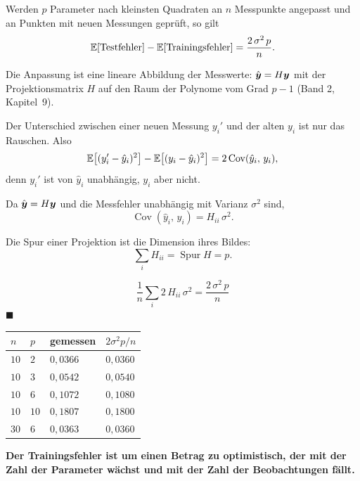 \begin{merksatz}
Werden $p$ Parameter nach kleinsten Quadraten an $n$ Messpunkte angepasst und an  Punkten mit neuen Messungen geprüft, so gilt
\[ \mathbb{E}[\text{Testfehler}] - \mathbb{E}[\text{Trainingsfehler}] = \frac{2\,\sigma^{2}\,p}{n} . \]

Die Anpassung ist eine lineare Abbildung der Messwerte: $\hat{\boldsymbol{y}} = H\boldsymbol{y}$ mit der Projektionsmatrix $H$ auf den Raum der Polynome vom Grad $p-1$ (Band 2, Kapitel~9).

 Der Unterschied zwischen einer neuen Messung $y_i'$ und der alten $y_i$ ist nur das Rauschen. Also
\[ \mathbb{E}\bigl[(y_i'-\hat y_i)^{2}\bigr] - \mathbb{E}\bigl[(y_i-\hat y_i)^{2}\bigr] = 2\operatorname{Cov}(\hat y_i,\,y_i) , \]
denn $y_i'$ ist von $\hat y_i$ unabhängig, $y_i$ aber nicht.

 Da $\hat{\boldsymbol{y}} = H\boldsymbol{y}$ und die Messfehler unabhängig mit Varianz $\sigma^{2}$ sind,
\[ \operatorname{Cov}(\hat y_i,\, y_i) = H_{ii}\,\sigma^{2} . \]

 Die Spur einer Projektion ist die Dimension ihres Bildes:
\[ \sum_i H_{ii} = \operatorname{Spur} H = p . \]

\[ \frac1n\sum_i 2\,H_{ii}\,\sigma^{2} = \frac{2\,\sigma^{2}\,p}{n} \]
$\blacksquare$

\begin{center}
{\small
\renewcommand{\arraystretch}{1.46}
\begin{tabular}{@{}P{1.2cm}P{1.2cm}P{2.4cm}P{2.4cm}@{}}
\toprule
$n$ & $p$ & \textbf{gemessen} & $2\sigma^{2}p/n$\\
\midrule
$10$ & $2$ & $0{,}0366$ & $0{,}0360$\\
$10$ & $3$ & $0{,}0542$ & $0{,}0540$\\
$10$ & $6$ & $0{,}1072$ & $0{,}1080$\\
$10$ & $10$ & $0{,}1807$ & $0{,}1800$\\
$30$ & $6$ & $0{,}0363$ & $0{,}0360$\\
\bottomrule
\end{tabular}}
\end{center}

\begin{center}
\begin{minipage}{0.9\textwidth}
\textbf{Der Trainingsfehler ist um einen Betrag zu optimistisch, der mit der Zahl der Parameter wächst und mit der Zahl der Beobachtungen fällt.}
\end{minipage}
\end{center}


\end{merksatz}
